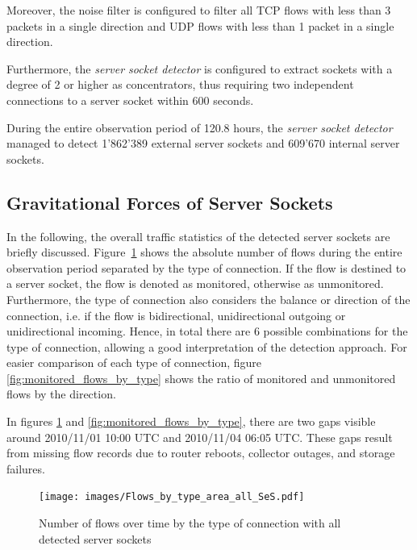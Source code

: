 Moreover, the noise filter is configured to filter all \gls{TCP} flows with less than 3 packets in a single direction and \gls{UDP} flows with less than 1 packet in a single direction.

Furthermore, the \emph{server socket detector} is configured to extract sockets with a degree of 2 or higher as concentrators, thus requiring two independent connections to a \gls{server socket} within 600 seconds.

During the entire observation period of 120.8 hours, the \emph{server socket detector} managed to detect 1'862'389 external \glspl{server socket} and 609'670 internal \glspl{server socket}.

\subsection{Gravitational Forces of Server Sockets}
In the following, the overall traffic statistics of the detected \glspl{server socket} are briefly discussed. Figure \ref{fig:flows_by_type} shows the absolute number of flows during the entire observation period separated by the type of connection. 
If the flow is destined to a \gls{server socket}, the flow is denoted as monitored, otherwise as unmonitored.
Furthermore, the type of connection also considers the balance or direction of the connection, i.e. if the flow is bidirectional, unidirectional outgoing or unidirectional incoming. 
Hence, in total there are 6 possible combinations for the type of connection, allowing a good interpretation of the detection approach.
For easier comparison of each type of connection, figure \ref{fig:monitored_flows_by_type} shows the ratio of monitored and unmonitored flows by the direction.

In figures \ref{fig:flows_by_type} and \ref{fig:monitored_flows_by_type}, there are two gaps visible around 2010/11/01 10:00 UTC and 2010/11/04 06:05 UTC. 
These gaps result from missing flow records due to router reboots, collector outages, and storage failures\citep{Schatzmann:Mining}.

\begin{figure}
	[ht] \centering
	\texttt{[image: images/Flows\_by\_type\_area\_all\_SeS.pdf]}
	\caption{Number of flows over time by the type of connection with all detected server sockets}
	\label{fig:flows_by_type}
\end{figure}

